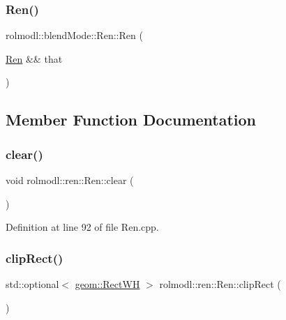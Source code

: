 \mbox{\label{classrolmodl_1_1blend_mode_1_1_ren_a31c9148c13f0f44c046d1bfe306bf08d}} 
\subsubsection{\texorpdfstring{Ren()}{Ren()}\hspace{0.1cm}{\footnotesize\ttfamily [6/6]}}
{\footnotesize\ttfamily rolmodl\+::blend\+Mode\+::\+Ren\+::\+Ren (\begin{DoxyParamCaption}\item[{\mbox{\hyperlink{classrolmodl_1_1blend_mode_1_1_ren}{Ren}} \&\&}]{that }\end{DoxyParamCaption})\hspace{0.3cm}{\ttfamily [noexcept]}}



\subsection{Member Function Documentation}
\mbox{\label{classrolmodl_1_1blend_mode_1_1_ren_a2742970d4e0bfc215e01d8ec525784c1}} 
\subsubsection{\texorpdfstring{clear()}{clear()}}
{\footnotesize\ttfamily void rolmodl\+::ren\+::\+Ren\+::clear (\begin{DoxyParamCaption}{ }\end{DoxyParamCaption})}



Definition at line 92 of file Ren.\+cpp.

\mbox{\label{classrolmodl_1_1blend_mode_1_1_ren_a9cf59071d36a429b56fe7a6389ea558b}} 
\subsubsection{\texorpdfstring{clipRect()}{clipRect()}}
{\footnotesize\ttfamily std\+::optional$<$ \mbox{\hyperlink{structrolmodl_1_1geom_1_1_rect_w_h}{geom\+::\+Rect\+WH}} $>$ rolmodl\+::ren\+::\+Ren\+::clip\+Rect (\begin{DoxyParamCaption}{ }\end{DoxyParamCaption})\hspace{0.3cm}{\ttfamily [noexcept]}}



